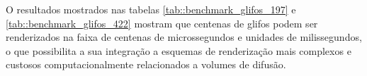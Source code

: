 \documentclass[
    12pt,                %
    oneside,            %
    a4paper,            %
    english,            %
    french,                %
    spanish,            %
    brazil                %
    ]{abntex2}
\begin{document}
O resultados mostrados nas tabelas \ref{tab::benchmark_glifos_197} e \ref{tab::benchmark_glifos_422} mostram que centenas de glifos podem ser renderizados na faixa de centenas de microssegundos e unidades de milissegundos, o que possibilita a sua integração a esquemas de renderização mais complexos e custosos computacionalmente relacionados a volumes de difusão.

\pagebreak










\end{document}
